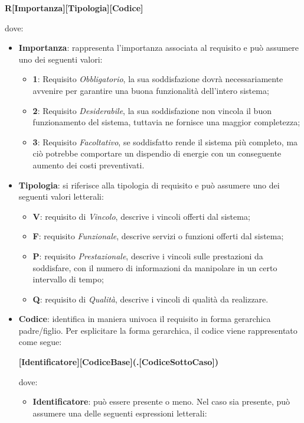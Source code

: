 \begin{center}
\textbf{R[Importanza][Tipologia][Codice]}
\end{center}
dove:
\begin{itemize}
\item \textbf{Importanza}: rappresenta l’importanza associata al requisito e può assumere uno dei seguenti valori:
\begin{itemize}
	\item \textbf{1}: Requisito \textit{Obbligatorio}, la sua soddisfazione dovrà necessariamente avvenire per garantire una buona funzionalità dell’intero sistema;
	\item \textbf{2}: Requisito \textit{Desiderabile}, la sua soddisfazione non vincola il buon funzionamento del sistema, tuttavia ne fornisce una maggior completezza;
	\item \textbf{3}: Requisito \textit{Facoltativo}, se soddisfatto rende il sistema più completo, ma ciò potrebbe comportare un dispendio di energie con un conseguente aumento dei costi preventivati.
\end{itemize}
\item \textbf{Tipologia}: si riferisce alla tipologia di requisito e può assumere uno dei seguenti valori letterali:
\begin{itemize}
	\item \textbf{V}: requisito di \textit{Vincolo}, descrive i vincoli offerti dal sistema;
	\item \textbf{F}: requisito \textit{Funzionale}, descrive servizi o funzioni offerti dal sistema;
	\item \textbf{P}: requisito \textit{Prestazionale}, descrive i vincoli sulle prestazioni da soddisfare, con il numero di informazioni da manipolare in un certo intervallo di tempo;
	\item \textbf{Q}: requisito di \textit{Qualità}, descrive i vincoli di qualità da realizzare.
\end{itemize}
\item \textbf{Codice}: identifica in maniera univoca il requisito in forma gerarchica padre/figlio.
Per esplicitare la forma gerarchica, il codice viene rappresentato come segue:
\begin{center}
\textbf{[Identificatore][CodiceBase](.[CodiceSottoCaso])}
\end{center}
dove: 
\begin{itemize}
	\item \textbf{Identificatore}: può essere presente o meno. Nel caso sia presente, può assumere una delle seguenti espressioni letterali:

\end{itemize}
\end{itemize}
